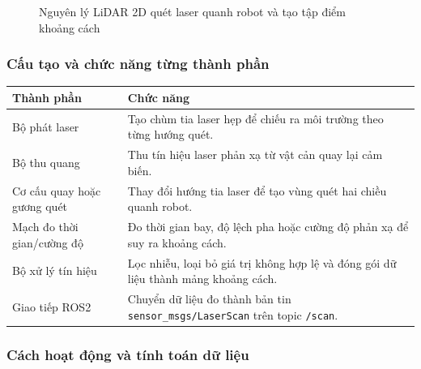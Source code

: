 \begin{figure}[H]
\centering
{}
\caption{Nguyên lý LiDAR 2D quét laser quanh robot và tạo tập điểm khoảng cách}
\label{fig:lidar-principle}
\end{figure}

\subsubsection{Cấu tạo và chức năng từng thành phần}

\renewcommand{\arraystretch}{1.25}
\begin{longtable}{|
  >{\raggedright\arraybackslash}p{}|
  >{\raggedright\arraybackslash}p{}|}
\hline
\textbf{Thành phần} & \textbf{Chức năng} \\ \hline
\hline
\endhead
\hline
\endlastfoot
Bộ phát laser & Tạo chùm tia laser hẹp để chiếu ra môi trường theo từng
hướng quét. \\ \hline
Bộ thu quang & Thu tín hiệu laser phản xạ từ vật cản quay lại cảm
biến. \\ \hline
Cơ cấu quay hoặc gương quét & Thay đổi hướng tia laser để tạo vùng quét
hai chiều quanh robot. \\ \hline
Mạch đo thời gian/cường độ & Đo thời gian bay, độ lệch pha hoặc cường độ
phản xạ để suy ra khoảng cách. \\ \hline
Bộ xử lý tín hiệu & Lọc nhiễu, loại bỏ giá trị không hợp lệ và đóng gói
dữ liệu thành mảng khoảng cách. \\ \hline
Giao tiếp ROS2 & Chuyển dữ liệu đo thành bản tin
\texttt{sensor\_msgs/LaserScan} trên topic \texttt{/scan}. \\ \hline
\end{longtable}

\subsubsection{Cách hoạt động và tính toán dữ liệu}

